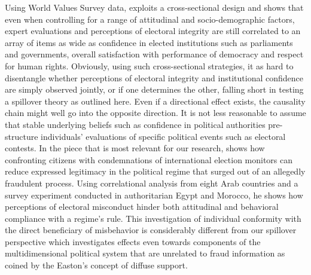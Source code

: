 \documentclass[11pt, ngerman,english,a4]{article}
\begin{document}
Using World Values Survey data, \citet{Norris2014, Norris2019} exploits a cross-sectional design and shows that even when controlling for a range of attitudinal and socio-demographic factors, expert evaluations and perceptions of electoral integrity are still correlated to an array of items as wide as confidence in elected institutions such as parliaments and governments, overall satisfaction with performance of democracy and respect for human rights. Obviously, using such cross-sectional strategies, it as hard to disentangle whether perceptions of electoral integrity and institutional confidence are simply observed jointly, or if one determines the other, falling short in testing a spillover theory as outlined here.  Even if a directional effect exists, the causality chain might well go into the opposite direction. It is not less reasonable to assume that stable underlying beliefs such as confidence in political authorities pre-structure individuals' evaluations of specific political events such as electoral contests. 
In the piece that is most relevant for our research, \citet{Williamson2021} shows how confronting citizens with condemnations of international election monitors can reduce expressed legitimacy in the political regime that surged out of an allegedly fraudulent process. Using correlational analysis from eight Arab countries and a survey experiment conducted in authoritarian Egypt and Morocco, he shows how perceptions of electoral misconduct hinder both attitudinal and behavioral compliance with a regime's rule. This investigation of individual conformity with the direct beneficiary of misbehavior is considerably different from our spillover perspective which investigates effects even towards components of the multidimensional political system that are unrelated to fraud information as coined by the Easton's concept of diffuse support. 

\end{document}
